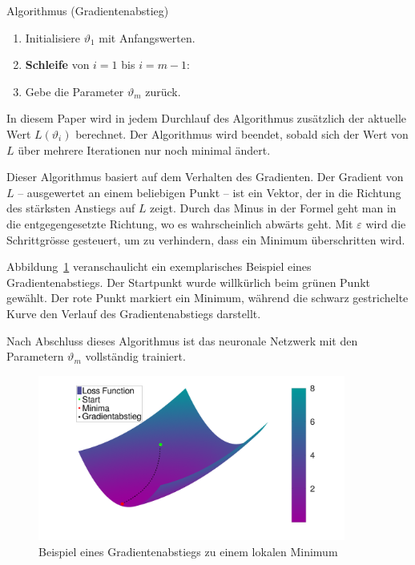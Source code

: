 \begin{aufgabe}
    Algorithmus (Gradientenabstieg)
    \begin{enumerate}
        \item Initialisiere \( \vartheta_1 \) mit Anfangswerten.
        \item \textbf{Schleife} von \( i = 1 \) bis \( i = m - 1 \):
        \item Gebe die Parameter \( \vartheta_m \) zurück.
    \end{enumerate}
    \label{neuronal:gradient_descent}
\end{aufgabe}

In diesem Paper wird in jedem Durchlauf des Algorithmus zusätzlich der aktuelle Wert \( L(\vartheta_i) \) berechnet.
Der Algorithmus wird beendet, sobald sich der Wert von \( L \) über mehrere Iterationen nur noch minimal ändert.

Dieser Algorithmus basiert auf dem Verhalten des Gradienten.
Der Gradient von $L$ -- ausgewertet an einem beliebigen Punkt -- ist ein Vektor, der in die Richtung des stärksten Anstiegs auf $L$ zeigt.
Durch das Minus in der Formel geht man in die entgegengesetzte Richtung, wo es wahrscheinlich abwärts geht.
Mit $\varepsilon$ wird die Schrittgrösse gesteuert, um zu verhindern, dass ein Minimum überschritten wird.

Abbildung~\ref{fig:gradientenabstieg_beispiel} veranschaulicht ein exemplarisches Beispiel eines Gradientenabstiegs.
Der Startpunkt wurde willkürlich beim grünen Punkt gewählt.
Der rote Punkt markiert ein Minimum, während die schwarz gestrichelte Kurve den Verlauf des Gradientenabstiegs darstellt.

Nach Abschluss dieses Algorithmus ist das neuronale Netzwerk mit den Parametern \( \vartheta_m \) vollständig trainiert.

\begin{figure}
    \centering
    \hspace*{-0.1\textwidth}
    \includegraphics[width=0.9\textwidth]{papers/neuronal/images/gd_close_to_minima_long_distances_with_line.png}
    \caption{Beispiel eines Gradientenabstiegs zu einem lokalen Minimum}
    \label{fig:gradientenabstieg_beispiel}
\end{figure}



